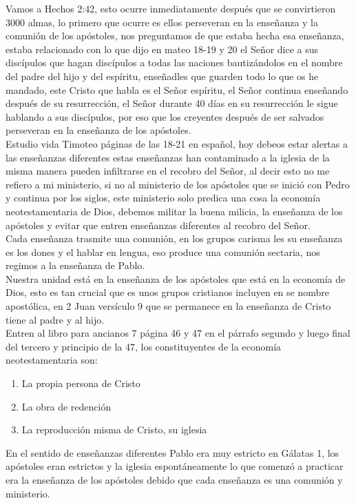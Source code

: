 \documentclass[12pt]{article}
\begin{document}
Vamos a Hechos 2:42, esto ocurre inmediatamente después que se convirtieron 3000 almas, lo primero que ocurre es ellos perseveran en la enseñanza y la comunión de los apóstoles, nos preguntamos de que estaba hecha esa enseñanza, estaba relacionado con lo que dijo en mateo 18-19 y 20 el Señor dice a sus discípulos que hagan discípulos a todas las naciones bautizándolos en el nombre del padre del hijo y del espíritu, enseñadles que guarden todo lo que os he mandado, este Cristo que habla es el Señor espíritu, el Señor continua enseñando después de su resurrección, el Señor durante 40 días en su resurrección le sigue hablando a sus discípulos, por eso que los creyentes después de ser salvados perseveran en la enseñanza de los apóstoles.\\

Estudio vida Timoteo páginas de las 18-21 en español, hoy debeos estar alertas a las enseñanzas diferentes estas enseñanzas han contaminado a la iglesia de la misma manera pueden infiltrarse en el recobro del Señor, al decir esto no me refiero a mi ministerio, si no al ministerio de los apóstoles que se inició con Pedro y continua por los siglos, este ministerio solo predica una cosa la economía neotestamentaria de Dios, debemos militar la buena milicia, la enseñanza de los apóstoles y evitar que entren enseñanzas diferentes al recobro del Señor.\\

Cada enseñanza trasmite una comunión, en los grupos carisma les su enseñanza es los dones y el hablar en lengua, eso produce una comunión sectaria, nos regimos a la enseñanza de Pablo.\\

Nuestra unidad está en la enseñanza de los apóstoles que está en la economía de Dios, esto es tan crucial que es unos grupos cristianos incluyen en se nombre apostólica, en 2 Juan versículo 9 que se permanece en la enseñanza de Cristo tiene al padre y al hijo.\\

Entren al libro para ancianos 7 página 46 y 47 en el párrafo segundo y luego final del tercero y principio de la 47, los constituyentes de la economía neotestamentaria son: 
\begin{enumerate}

\item La propia persona de Cristo
\item La obra de redención
\item La reproducción misma de Cristo, su iglesia

\end{enumerate} 
En el sentido de enseñanzas diferentes Pablo era muy estricto en Gálatas 1, los apóstoles eran estrictos y la iglesia espontáneamente lo que comenzó a practicar era la enseñanza de los apóstoles debido que cada enseñanza es una comunión y ministerio.\\
\end{document}
